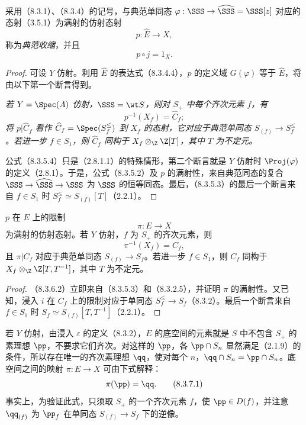 采用（8.3.1）、（8.3.4）的记号，与典范单同态 $\varphi:\SSS\to\widehat{\SSS}=\SSS[z]$ 对应的态射（3.5.1）为满射的仿射态射
\begin{equation}
p:\widehat E\longrightarrow X,
\tag{8.3.5.1}
\end{equation}
称为\emph{典范收缩}，并且
\begin{equation}
p\circ j=1_X.
\tag{8.3.5.2}
\end{equation}
\begin{proof}
可设 $Y$ 仿射。利用 $\widehat E$ 的表达式（8.3.4.4），$p$ 的定义域 $G(\varphi)$ 等于 $\widehat E$，将由以下第一个断言得到。

\emph{若 $Y=\Spec(A)$ 仿射，$\SSS=\wt S$，则对 $S_+$ 中每个齐次元素 $f$，有}
\begin{equation}
p^{-1}(X_f)=\widehat C_f;
\tag{8.3.5.4}
\end{equation}
\emph{将 $p|\widehat C_f$ 看作 $\widehat C_f=\Spec(S_f^{\leq})$ 到 $X_f$ 的态射，它对应于典范单同态 $S_{(f)}\to S_f^{\leq}$。若进一步 $f\in S_1$，则 $\widehat C_f$ 同构于 $X_f\otimes_{\Z}\Z[T]$，其中 $T$ 为不定元。}

公式（8.3.5.4）只是（2.8.1.1）的特殊情形，第二个断言就是 $Y$ 仿射时 $\Proj(\varphi)$ 的定义（2.8.1）。于是，公式（8.3.5.2）及 $p$ 的满射性，来自典范同态的复合 $\SSS\to\widehat{\SSS}\to\SSS$ 为 $\SSS$ 的恒等同态。最后，（8.3.5.3）的最后一个断言来自 $f\in S_1$ 时 $S_f^{\leq}\simeq S_{(f)}[T]$（2.2.1）。
\end{proof}

$p$ 在 $E$ 上的限制
\begin{equation}
\pi:E\longrightarrow X
\tag{8.3.6.1}
\end{equation}
为满射的仿射态射。若 $Y$ 仿射，$f$ 为 $S_+$ 的齐次元素，则
\begin{equation}
\pi^{-1}(X_f)=C_f,
\tag{8.3.6.2}
\end{equation}
且 $\pi|C_f$ 对应于典范单同态 $S_{(f)}\to S_f$。若进一步 $f\in S_1$，则 $C_f$ 同构于 $X_f\otimes_{\Z}\Z[T,T^{-1}]$，其中 $T$ 为不定元。
\begin{proof}
（8.3.6.2）立即来自（8.3.5.3）和（8.3.2.5），并证明 $\pi$ 的满射性。又已知，浸入 $i$ 在 $C_f$ 上的限制对应于单同态 $S_f^{\leq}\to S_f$（8.3.2）。最后一个断言来自 $f\in S_1$ 时 $S_f\simeq S_{(f)}[T,T^{-1}]$（2.2.1）。
\end{proof}

若 $Y$ 仿射，由浸入 $\varepsilon$ 的定义（8.3.2），$E$ 的底空间的元素就是 $S$ 中不包含 $S_+$ 的素理想 $\pp$，不要求它们齐次。对这样的 $\pp$，各 $\pp\cap S_n$ 显然满足（2.1.9）的条件，所以存在唯一的齐次素理想 $\qq$，使对每个 $n$，$\qq\cap S_n=\pp\cap S_n$。底空间之间的映射 $\pi:E\to X$ 可由下式解释：
\begin{equation}
\pi(\pp)=\qq.
\tag{8.3.7.1}
\end{equation}
事实上，为验证此式，只须取 $S_+$ 的一个齐次元素 $f$，使 $\pp\in D(f)$，并注意 $\qq_{(f)}$ 为 $\pp_f$ 在单同态 $S_{(f)}\to S_f$ 下的逆像。

